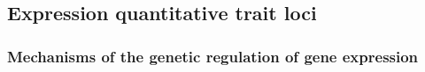 \subsection{Expression quantitative trait loci}
\label{sec:eqtl}






\subsubsection{Mechanisms of the genetic regulation of gene expression}

